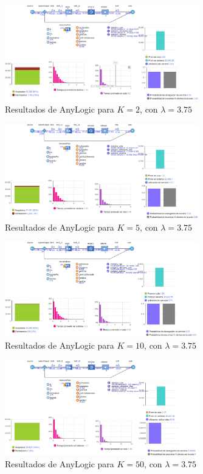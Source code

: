 \documentclass[12pt]{article}
\begin{document}
\begin{figure}[H]
    \centering
    \includegraphics[width=0.75\textwidth]{./graficas/mm1k/anylogic/k_2.png}
    \caption{Resultados de AnyLogic para \( K = 2 \), con \( \lambda = 3.75 \)}
\end{figure}

\begin{figure}[H]
    \centering
    \includegraphics[width=0.75\textwidth]{./graficas/mm1k/anylogic/k_5.png}
    \caption{Resultados de AnyLogic para \( K = 5 \), con \( \lambda = 3.75 \)}
\end{figure}

\begin{figure}[H]
    \centering
    \includegraphics[width=0.75\textwidth]{./graficas/mm1k/anylogic/k_10.png}
    \caption{Resultados de AnyLogic para \( K = 10 \), con \( \lambda = 3.75 \)}
\end{figure}

\begin{figure}[H]
    \centering
    \includegraphics[width=0.75\textwidth]{./graficas/mm1k/anylogic/k_50.png}
    \caption{Resultados de AnyLogic para \( K = 50 \), con \( \lambda = 3.75 \)}
\end{figure}
\end{document}
